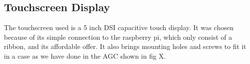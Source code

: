 \documentclass[11pt,landscape]{article}
\begin{document}
\begin{multicols}{3}
\subsection{Touchscreen Display}
The touchscreen used is a 5 inch DSI capacitive touch display. It was chosen
because of its simple connection to the raspberry pi, which only consist of a
ribbon, and its affordable offer. It also brings mounting holes and screws to
fit it in a case as we have done in the AGC shown in fig X. 

\newpage
\nocite{*}


\end{multicols}
\end{document}
